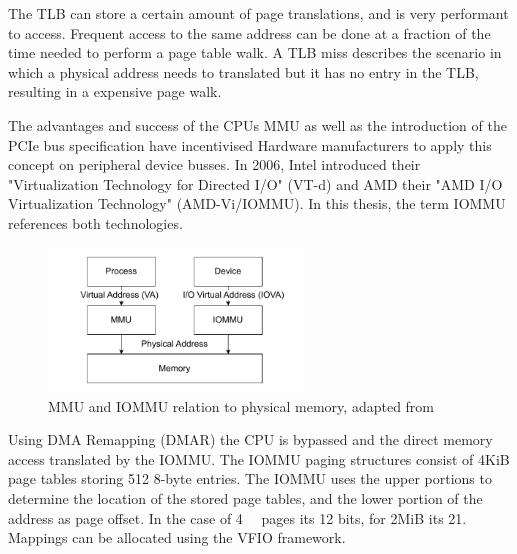 The TLB can store a certain amount of page translations, and is very performant to access. Frequent access to the same address can be done at a fraction of the time needed to perform a page table walk. A TLB miss describes the scenario in which a physical address needs to translated but it has no entry in the TLB, resulting in a expensive page walk.

The advantages and success of the CPUs MMU as well as the introduction of the PCIe bus specification have incentivised Hardware manufacturers to apply this concept on peripheral device busses. In 2006, Intel introduced their "Virtualization Technology for Directed I/O" (VT-d) and AMD their "AMD I/O Virtualization Technology" (AMD-Vi/IOMMU). In this thesis, the term IOMMU references both technologies.

\begin{figure}
    \centering
    \includegraphics[width=0.6\textwidth]{figures/MMUIOMMU.pdf}
    \caption{MMU and IOMMU relation to physical memory, adapted from \cite{iommuscalability}}
    \label{fig:mmuvsiommu}
\end{figure}

Using DMA Remapping (DMAR) the CPU is bypassed and the direct memory access translated by the IOMMU.
The IOMMU paging structures consist of 4KiB page tables storing 512 8-byte entries. The IOMMU uses the upper portions to determine the location of the stored page tables, and the lower portion of the address as page offset. In the case of \qty{4}{\kibi\byte} pages its 12 bits, for 2MiB its 21.
Mappings can be allocated using the VFIO framework.


